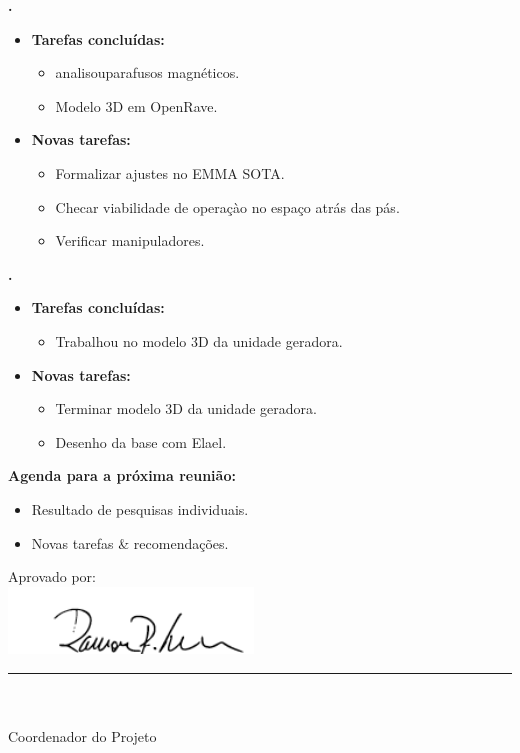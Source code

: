 \textbf{\gabriel.} 
	\begin{itemize}
		\item \textbf{Tarefas concluídas:}
			\begin{itemize}    
				\item analisouparafusos magnéticos.
				\item Modelo 3D em OpenRave.
			\end{itemize}
		
		\item \textbf{Novas tarefas:}
			\begin{itemize} 
				\item Formalizar ajustes no EMMA SOTA.
				\item Checar viabilidade de operaçào no espaço atrás das pás.
				\item Verificar manipuladores.
			\end{itemize}
	\end{itemize}
					
			
   \textbf{.} 
	\begin{itemize}
		\item \textbf{Tarefas concluídas:}
			\begin{itemize}    
				\item Trabalhou no modelo 3D da unidade geradora.
			\end{itemize}
		
		\item \textbf{Novas tarefas:}
			\begin{itemize} 
			    \item Terminar modelo 3D da unidade geradora.
				\item Desenho da base com Elael.
			\end{itemize}
	\end{itemize}

			



\textbf{Agenda para a próxima reunião:}
  \begin{itemize}
    \item Resultado de pesquisas individuais.
    \item Novas tarefas \& recomendações.
  \end{itemize}


\vspace{5mm}%
\parbox[t]{70mm}{
  Aprovado por: \\[5mm]
  \centering
  \includegraphics[width=65mm]{figs/logo/assinatura-ramon.png} \\[-4mm]
  \rule[2mm]{70mm}{0.1mm} \\
  \ramon \\[1mm]
  Coordenador do Projeto \\
}

\fim
